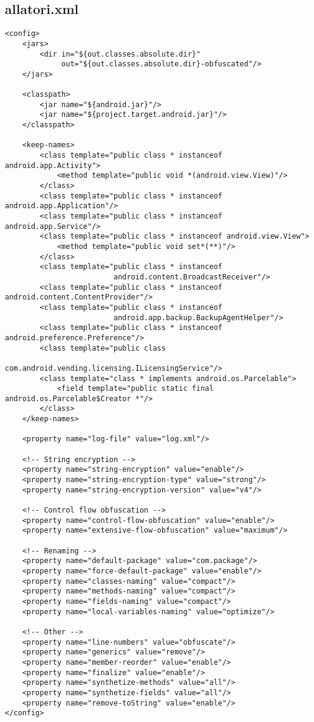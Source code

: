 \subsection{allatori.xml}
\label{app:oa}
\begin{lstlisting}
<config>
    <jars>
        <dir in="${out.classes.absolute.dir}"
             out="${out.classes.absolute.dir}-obfuscated"/>
    </jars>

    <classpath>
        <jar name="${android.jar}"/>
        <jar name="${project.target.android.jar}"/>
    </classpath>

    <keep-names>
        <class template="public class * instanceof android.app.Activity">
            <method template="public void *(android.view.View)"/>
        </class>
        <class template="public class * instanceof android.app.Application"/>
        <class template="public class * instanceof android.app.Service"/>
        <class template="public class * instanceof android.view.View">
            <method template="public void set*(**)"/>
        </class>
        <class template="public class * instanceof
                         android.content.BroadcastReceiver"/>
        <class template="public class * instanceof android.content.ContentProvider"/>
        <class template="public class * instanceof
                         android.app.backup.BackupAgentHelper"/>
        <class template="public class * instanceof android.preference.Preference"/>
        <class template="public class
                         com.android.vending.licensing.ILicensingService"/>
        <class template="class * implements android.os.Parcelable">
            <field template="public static final android.os.Parcelable$Creator *"/>
        </class>
    </keep-names>

    <property name="log-file" value="log.xml"/>

    <!-- String encryption -->
    <property name="string-encryption" value="enable"/>
    <property name="string-encryption-type" value="strong"/>
    <property name="string-encryption-version" value="v4"/>

    <!-- Control flow obfuscation -->
    <property name="control-flow-obfuscation" value="enable"/>
    <property name="extensive-flow-obfuscation" value="maximum"/>

    <!-- Renaming -->
    <property name="default-package" value="com.package"/>
    <property name="force-default-package" value="enable"/>
    <property name="classes-naming" value="compact"/>
    <property name="methods-naming" value="compact"/>
    <property name="fields-naming" value="compact"/>
    <property name="local-variables-naming" value="optimize"/>

    <!-- Other -->
    <property name="line-numbers" value="obfuscate"/>
    <property name="generics" value="remove"/>
    <property name="member-reorder" value="enable"/>
    <property name="finalize" value="enable"/>
    <property name="synthetize-methods" value="all"/>
    <property name="synthetize-fields" value="all"/>
    <property name="remove-toString" value="enable"/>
</config>
\end{lstlisting}